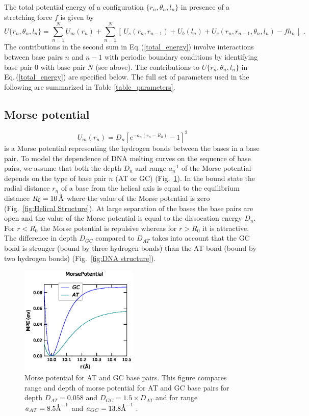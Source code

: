 \documentclass[12pt,masters,final]{UTRGVthesis}
\begin{document}
%
The total potential energy of a configuration $\{r_n, \theta_n, l_n\}$ in presence of a
stretching force $f$ is given by
%
\begin{equation} \label{total_energy}
  U\{r_n, \theta_n, l_n\} = \sum_{n=1}^N U_m(r_n)
  + \sum_{n=1}^N \left[\,U_s(r_n,r_{n-1}) + U_b(l_n) +
      U_c(r_n,r_{n-1},\theta_n,l_n) - f h_n \, \right] \, \, .
\end{equation}
%
The contributions in the second sum in Eq.\,(\ref{total_energy}) involve interactions between
base pairs $n$ and $n-1$ with periodic boundary conditions by identifying base pair
$0$ with base pair $N$ (see above).
The contributions to $U\{r_n, \theta_n, l_n\}$ in Eq.\,(\ref{total_energy}) are specified
below. The full set of parameters used in the following are summarized in
Table \ref{table_parameters}.
\newpage
\subsection{Morse potential}
%
 \begin{equation} \label{morse}
    U_m\left(r_n\right) = D_n \left[e^{-a_n \left(r_n - R_0\right)} - 1 \right]^2
  \end{equation} 
  is a Morse potential representing the hydrogen bonds between the bases in a base pair.
  To model the
  dependence of DNA melting curves on the sequence of base pairs, we assume that both  the
  depth $D_n$ and range $a_n^{-1}$ of the Morse potential  depends on the type of base pair $n$ (AT or GC)
  (Fig.~\ref{fig:Morse Potential}). In the bound state the radial distance $r_n$ of a base from the helical axis is equal to the
  equilibrium distance $R_0 = 10 \, \text{\normalfont\AA}$ where the value of the Morse potential is zero
  (Fig.~\ref{fig:Helical Structure}). At large separation of the bases
  the base pairs are open and the value of the Morse potential is equal to the dissocation energy $D_{n}$.
  For $r<R_{0}$ the Morse potential is repulsive whereas for $r>R_{0}$ it is attractive. 
  The difference in depth $D_{GC}$ compared to $D_{AT}$ takes into account that the GC bond is stronger
  (bound by three hydrogen bonds) than the AT bond (bound by two hydrogen bonds)  (Fig.~\ref{fig:DNA structure}).
\begin{figure}[!h]
  \includegraphics[width=0.5\textwidth]{Morse_Potential_GC_AT.eps}
  \caption{\small Morse potential for AT and GC base pairs. This figure compares range and depth of morse potential for AT and GC base pairs for depth $D_{AT}=0.058$ and $D_{GC}=1.5\times D_{AT}$ and for range $a_{AT}=8.5\text{\normalfont\AA}^{-1} $ and $a_{GC}=13.8\text{\normalfont\AA}^{-1}$\,.}
\label{fig:Morse Potential}
\end{figure}
%
\newpage
\end{document}
